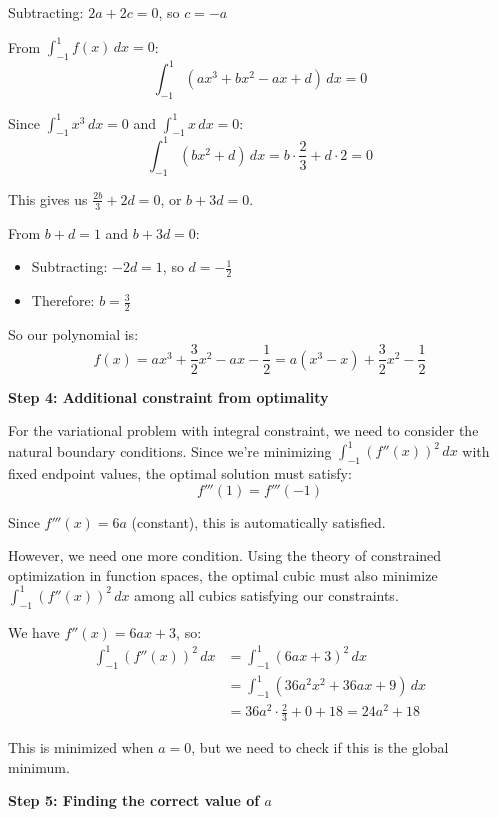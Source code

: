 \documentclass[12pt,a4paper]{article}
\theoremstyle{definition}
\begin{document}
        Subtracting: $2a + 2c = 0$, so $c = -a$

        From $\int_{-1}^{1} f(x) \, dx = 0$:
        $$\int_{-1}^{1} (ax^3 + bx^2 - ax + d) \, dx = 0$$

        Since $\int_{-1}^{1} x^3 \, dx = 0$ and $\int_{-1}^{1} x \, dx = 0$:
        $$\int_{-1}^{1} (bx^2 + d) \, dx = b \cdot \frac{2}{3} + d \cdot 2 = 0$$

        This gives us $\frac{2b}{3} + 2d = 0$, or $b + 3d = 0$.

        From $b + d = 1$ and $b + 3d = 0$:
        \begin{itemize}
            \item Subtracting: $-2d = 1$, so $d = -\frac{1}{2}$
            \item Therefore: $b = \frac{3}{2}$
        \end{itemize}

        So our polynomial is:
        $$f(x) = ax^3 + \frac{3}{2}x^2 - ax - \frac{1}{2} = a(x^3 - x) + \frac{3}{2}x^2 - \frac{1}{2}$$

        \textbf{Step 4: Additional constraint from optimality}

        For the variational problem with integral constraint, we need to consider the natural boundary conditions. Since we're minimizing $\int_{-1}^{1} (f''(x))^2 \, dx$ with fixed endpoint values, the optimal solution must satisfy:
        $$f'''(1) = f'''(-1)$$

        Since $f'''(x) = 6a$ (constant), this is automatically satisfied.

        However, we need one more condition. Using the theory of constrained optimization in function spaces, the optimal cubic must also minimize $\int_{-1}^{1} (f''(x))^2 \, dx$ among all cubics satisfying our constraints.

        We have $f''(x) = 6ax + 3$, so:
        \begin{align}
            \int_{-1}^{1} (f''(x))^2 \, dx &= \int_{-1}^{1} (6ax + 3)^2 \, dx \\
            &= \int_{-1}^{1} (36a^2x^2 + 36ax + 9) \, dx \\
            &= 36a^2 \cdot \frac{2}{3} + 0 + 18 = 24a^2 + 18
        \end{align}

        This is minimized when $a = 0$, but we need to check if this is the global minimum.

        \textbf{Step 5: Finding the correct value of $a$}
\end{document}
